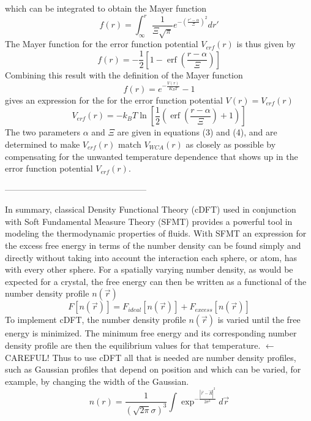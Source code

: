 \documentclass[12pt]{article}
\begin{document}
which can be integrated to obtain the Mayer function
\begin{equation}{f(r)=\int_{\infty}^r{ \frac{1}{\Xi\sqrt{\pi}}e^{-\left(\frac{r'-\alpha}{\Xi}\right)^2}{dr'}}}\end{equation} 
The Mayer function for the error function potential $V_{erf}(r)$ is thus given by
\begin{equation}{f(r)=-\frac{1}{2}\left[1-\operatorname{erf}\left(\frac{r-\alpha}{\Xi}\right)\right]}\end{equation} Combining this result with the definition of the Mayer function \begin{displaymath}f(r)=e^{-\frac{V(r)}{K_BT}}-1\end{displaymath} %
gives an expression for the for the error function potential  $V(r)=V_{erf}(r)$ 
\begin{equation}{V_{erf}(r)=-k_BT\ln\left[\frac{1}{2}\left(\operatorname{erf}\left(\frac{r-\alpha}{\Xi}\right)+1\right)\right]}\end{equation} The two parameters $\alpha$ and $\Xi$ are given in equations (3) and (4), and are determined to make $V_{erf}(r)$ match $V_{WCA}(r)$ as closely as possible by compensating for the unwanted temperature dependence that shows up in the error function potential $V_{erf}(r)$.
	
--------------------------------------------------



In summary, classical Density Functional Theory (cDFT) used in conjunction with Soft Fundamental Measure Theory (SFMT) provides a powerful tool in modeling the thermodynamic properties of fluids. With SFMT an expression for the excess free energy in terms of the number density can be found simply and directly without taking into account the interaction each sphere, or atom, has with every other sphere. For a spatially varying number density, as would be expected for a crystal, the free energy can then be written as a functional of the number density profile $n(\vec{r})$ 
\begin{equation}{F[n(\vec{r})]=F_{ideal}[n(\vec{r})] + F_{excess}[n(\vec{r})]}\end{equation} 
To implement cDFT, the number density profile $n(\vec{r})$ is varied until the free energy is minimized. The minimum free energy and its corresponding number density profile are then the equilibrium values for that temperature. \color{red} $\leftarrow$CAREFUL! \color{black} Thus to use cDFT all that is needed are number density profiles, such as Gaussian profiles that depend on position and which can be varied, for example, by changing the width of the Gaussian. 
\begin{equation}{n(r)=\frac{1}{\left(\sqrt{2\pi}\sigma\right)^3}\int\exp^{-\frac{|\vec{r}-\vec{R}|^2}{2\sigma^2}}d\vec{r}}\end{equation} 
\end{document}
